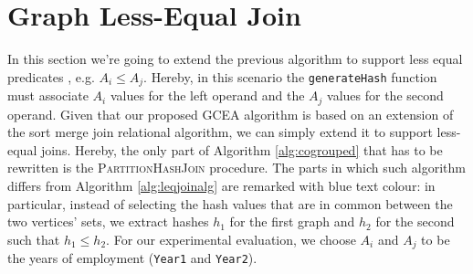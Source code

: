 

\section{Graph Less-Equal Join}\label{sec:lessequaljoin}
In this section we're going to extend the previous algorithm to support less equal predicates , e.g. $A_i\leq A_j$. Hereby, in this scenario the \texttt{generateHash} function must associate $A_i$ values for the left operand and the $A_j$ values for the second operand. Given that our proposed GCEA algorithm is based on an extension of the sort merge join relational algorithm, we can simply extend it to support less-equal joins. Hereby, the only part of Algorithm \ref{alg:cogrouped} that has to be rewritten is the \textsc{PartitionHashJoin} procedure. The parts in which such algorithm differs from Algorithm \ref{alg:leqjoinalg} are remarked with blue text colour: in particular, instead of selecting the hash values that are in common between the two vertices' sets, we extract hashes $h_1$ for the first graph and $h_2$ for the second such that $h_1\leq h_2$.  For our experimental evaluation, we choose $A_i$ and $A_j$ to be the years of employment (\texttt{Year1} and \texttt{Year2}).



